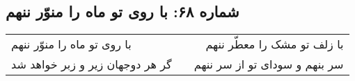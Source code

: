 \begin{center}
\section*{شماره ۶۸: با روی تو ماه را منوّر ننهم}
\label{sec:068}
\begin{longtable}{l p{0.5cm} r}
با روی تو ماه را منوّر ننهم
&&
با زلف تو مشک را معطّر ننهم
\\
گر هر دوجهان زیر و زبر خواهد شد
&&
سر بنهم و سودای تو از سر ننهم
\\
\end{longtable}
\end{center}
